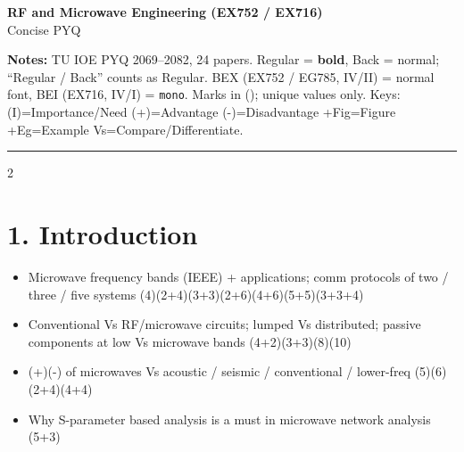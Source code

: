 \documentclass[10pt]{article}
\begin{document}
\begin{center}
  {\large\bfseries RF and Microwave Engineering (EX752 / EX716)}\\[0.2em]
  {\normalsize Concise PYQ}
\end{center}
\vspace{-0.4em}
\small
\textbf{Notes:} TU IOE PYQ 2069--2082, 24 papers. Regular = \textbf{bold}, Back = normal; ``Regular / Back'' counts as Regular.
BEX (EX752 / EG785, IV/II) = normal font, BEI (EX716, IV/I) = \texttt{mono}.
Marks in (); unique values only.
Keys: (I)=Importance/Need \quad (+)=Advantage \quad (-)=Disadvantage \quad +Fig=Figure \quad +Eg=Example \quad Vs=Compare/Differentiate.
\vspace{2pt}
\hrule
\vspace{3pt}

\begin{multicols}{2}
\footnotesize

\section*{1. Introduction}
\begin{itemize}
  \item Microwave frequency bands (IEEE) + applications; comm protocols of two / three / five systems \hfill (4)(2+4)(3+3)(2+6)(4+6)(5+5)(3+3+4)
  \item Conventional Vs RF/microwave circuits; lumped Vs distributed; passive components at low Vs microwave bands \hfill (4+2)(3+3)(8)(10)
  \item (+)(-) of microwaves Vs acoustic / seismic / conventional / lower-freq \hfill (5)(6)(2+4)(4+4)
  \item Why S-parameter based analysis is a must in microwave network analysis \hfill (5+3)
\end{itemize}


\end{multicols}
\end{document}
